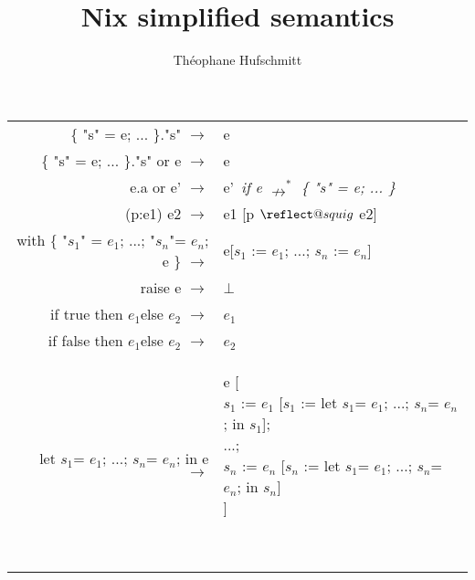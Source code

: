 \documentclass{article}
\title{Nix simplified semantics}
\author{Théophane Hufschmitt}
\date{}
\makeatletter
\providecommand{\leftsquigarrow}{%
  \mathrel{\mathpalette\reflect@squig\relax}%
}
\newcommand{\reflect@squig}[2]{%
  \reflectbox{$\m@th#1\rightsquigarrow$}%
}
\newcommand{\assign}[2]{#1 := #2}
\newcommand{\subst} [3] {#3 [\assign{#1}{#2}]}
\newcommand{\substp} [3] {#3 [#1 \ensuremath{\leftsquigarrow} #2]}
\newcommand{\dstep} [2] {#1 \ensuremath{\rightarrow} #2}
\newcommand{\ndsteps} [2] {#1 \ensuremath{\nrightarrow^*} #2}
\newcommand{\dstepa} [3] {\dstep{#1}{&#2}~\emph{#3} \\}
\newcommand{\sone}{\ensuremath{s_1}}
\newcommand{\sn}{\ensuremath{s_n}}
\newcommand{\eone}{\ensuremath{e_1}}
\newcommand{\etwo}{\ensuremath{e_2}}
\newcommand{\en}{\ensuremath{e_n}}
\makeatother
\begin{document}
\maketitle{}

\begin{tabular}{rl}
  \dstepa{\{ "s" = e; ... \}."s"}{e}{}
  \dstepa{\{ "s" = e; ... \}."s" or e}{e}{}
  \dstepa{e.a or e'}{e'}{if \ndsteps{e}{\{ "s" = e; ... \}}}
  \dstepa{(p:e1) e2}{\substp{p}{e2}{e1}}{} %
  \dstepa{with \{ "\sone" = \eone; ...; "\sn"= \en; e \}}{%
    e[\assign{\sone}{\eone}; ...; \assign{\sn}{\en}]
  }{}
  \dstepa{raise e}{$\bot$}{}
  \dstepa{if true then \eone else \etwo}{\eone}{}
  \dstepa{if false then \eone else \etwo}{\etwo}{}
  \dstepa{let \sone = \eone; ...; \sn = \en; in e}{%
    \parbox[t]{10cm}{e [ \\
      \assign{\sone}{\subst{\sone}{let \sone = \eone; ...; \sn = \en; in \sone}{\eone}}; \\
      ...; \\
      \assign{\sn}{\subst{\sn}{let \sone = \eone; ...; \sn = \en; in \sn}{\en}} \\
    ]}
  }{}
\end{tabular}
\end{document}
